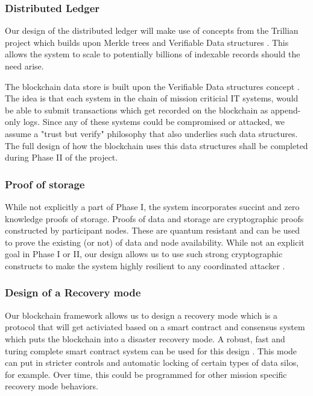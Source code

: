 \subsubsection{Distributed Ledger}

Our design of the distributed ledger will make use of concepts from the Trillian project which builds upon Merkle trees
and Verifiable Data structures \cite{verifiable2015}. This allows the system to scale to potentially billions of
indexable records should the need arise.

The blockchain data store is built upon the Verifiable Data structures concept \cite{verfiable2015}. The idea is that each
system in the chain of mission criticial IT systems, would be able to submit transactions which get recorded on the
blockchain as append-only logs. Since any of these systems could be compromised or attacked, we assume a "trust but
verify" philosophy that also underlies such data structures. The full design of how the blockchain uses this data
structures shall be completed during Phase II of the project.

\subsubsection{Proof of storage}

While not explicitly a part of Phase I, the system incorporates succint and zero knowledge proofs of storage. Proofs
of data and storage are cryptographic proofs constructed by participant nodes. These are quantum resistant and can be
used to prove the existing (or not) of data and node availability. While not an explicit goal in Phase I or II, our
design allows us to use such strong cryptographic constructs to make the system highly resilient to any coordinated
attacker \cite{ben2019}.

\subsubsection{Design of a Recovery mode}

Our blockchain framework allows us to design a recovery mode which is a protocol that will get activiated based on a 
smart contract and consensus system which puts the blockchain into a disaster recovery mode. A robust, fast and turing
complete smart contract system can be used for this design \cite{kalodner2018}. This mode can put in 
stricter controls and automatic locking of certain types of data silos, for example. Over time, this could be programmed
for other mission specific recovery mode behaviors.

